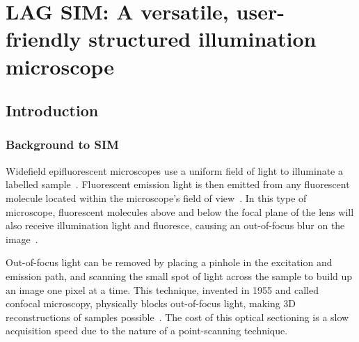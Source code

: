 \chapter{LAG SIM: A versatile, user-friendly structured illumination microscope} \label{chap:LAGSIM}

\ifpdf
    \graphicspath{{Chapter2/Figs/Raster/}{Chapter2/Figs/PDF/}{Chapter2/Figs/}}
\else
    \graphicspath{{Chapter2/Figs/Vector/}{Chapter2/Figs/}}
\fi

%

\section{Introduction} \label{sec:simintro}
\subsection{Background to SIM} \label{sec:sim-background}
Widefield epifluorescent microscopes use a uniform field of light to illuminate a labelled sample~\cite[\textit{ch. 2}]{lakowicz2007principles}.
Fluorescent emission light is then emitted from any fluorescent molecule located within the microscope's field of view~\cite{pawley2012handbook}.
In this type of microscope, fluorescent molecules above and below the focal plane of the lens will also receive illumination light and fluoresce, causing an out-of-focus blur on the image~\cite{wilson1984theory}.

Out-of-focus light can be removed by placing a pinhole in the excitation and emission path, and scanning the small spot of light across the sample to build up an image one pixel at a time.
This technique, invented in 1955 and called confocal microscopy, physically blocks out-of-focus light, making 3D reconstructions of samples possible~\cite{marvin1961microscopy}.
The cost of this optical sectioning is a slow acquisition speed due to the nature of a point-scanning technique.

